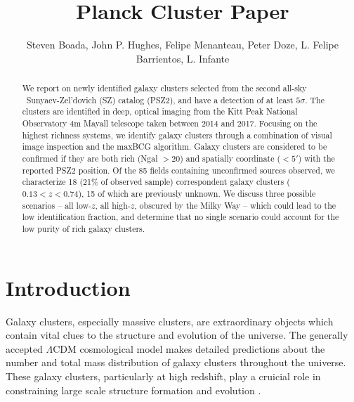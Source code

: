 \documentclass[apj, revtex4-1]{emulateapj}
\begin{document}
\title{Planck Cluster Paper}

\author{\sc Steven Boada,
John P. Hughes,
Felipe Menanteau,
Peter Doze,
L. Felipe Barrientos,
L. Infante
}



\begin{abstract}
\noindent We report on newly identified galaxy clusters selected from the second all-sky \planck\ Sunyaev-Zel'dovich (SZ) catalog (PSZ2), and have a detection of at least $5\sigma$. The clusters are identified in deep, optical imaging from the Kitt Peak National Observatory 4m Mayall telescope taken between 2014 and 2017. Focusing on the highest richness systems, we identify galaxy clusters through a combination of visual image inspection and the maxBCG algorithm. Galaxy clusters are considered to be confirmed if they are both rich (Ngal $>20$) and spatially coordinate ($<5'$) with the reported PSZ2 position. Of the 85 fields containing unconfirmed sources observed, we characterize 18 (21\% of observed sample) correspondent galaxy clusters ($ 0.13 < z < 0.74$), 15 of which are previously unknown. We discuss three possible scenarios -- all low-$z$, all high-$z$, obscured by the Milky Way -- which could lead to the low identification fraction, and determine that no single scenario could account for the low purity of rich galaxy clusters.
\end{abstract}

\section{Introduction}
Galaxy clusters, especially massive clusters, are extraordinary objects which contain vital clues to the structure and evolution of the universe. The generally accepted $\Lambda$CDM cosmological model makes detailed predictions about the number and total mass distribution of galaxy clusters throughout the universe. These galaxy clusters, particularly at high redshift, play a cruicial role in constraining large scale structure formation and evolution .
\end{document}

